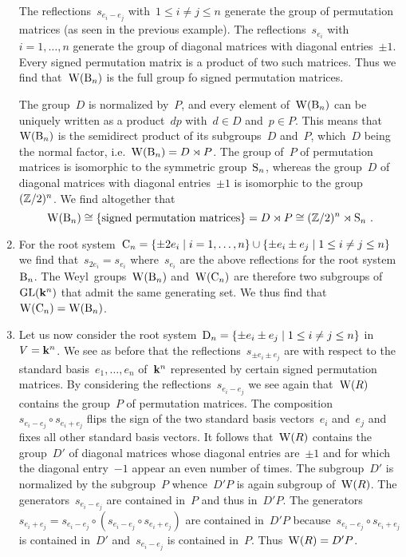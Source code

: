 \begin{examples}
\begin{enumerate}
      The reflections~$s_{e_i - e_j}$ with~$1 \leq i \neq j \leq n$ generate the group of permutation matrices (as seen in the previous example).
      The reflections~$s_{e_i}$ with~$i = 1, \dotsc, n$ generate the group of diagonal matrices with diagonal entries~$\pm 1$.
      Every signed permutation matrix is a product of two such matrices.
      Thus we find that~$\operatorname{W}(\mathrm{B}_n)$ is the full group fo signed permutation matrices.
      
      The group~$D$ is normalized by~$P$, and every element of~$\operatorname{W}(\mathrm{B}_n)$ can be uniquely written as a product~$dp$ with~$d \in D$ and~$p \in P$.
      This means that~$\operatorname{W}(\mathrm{B}_n)$ is the semidirect product of its subgroups~$D$ and~$P$, which~$D$ being the normal factor, i.e.~$\operatorname{W}(\mathrm{B}_n) = D \rtimes P$.
      The group of~$P$ of permutation matrices is isomorphic to the symmetric group~$\operatorname{S}_n$, whereas the group~$D$ of diagonal matrices with diagonal entries~$\pm 1$ is isomorphic to the group~$(\mathbb{Z}/2)^n$.
      We find altogether that
      \[
        \operatorname{W}(\mathrm{B}_n)
        \cong
        \{ \text{signed permutation matrices} \}
        =
        D \rtimes P
        \cong
        (\mathbb{Z}/2)^n \rtimes \operatorname{S}_n \,.
      \]
    \item
      For the root system~$\rootC_n = \{ \pm 2 e_i \suchthat i = 1, \dotsc, n \} \cup \{ \pm e_i \pm e_j \suchthat 1 \leq i \neq j \leq n \}$ we find that~$s_{2e_i} = s_{e_i}$ where~$s_{e_i}$ are the above reflections for the root system~$\mathrm{B}_n$.
      The Weyl~groups~$\operatorname{W}(\mathrm{B}_n)$ and~$\operatorname{W}(\mathrm{C}_n)$ are therefore two subgroups of~$\operatorname{GL}(\mathbf{k}^n)$ that admit the same generating set.
      We thus find that~$\operatorname{W}(\mathrm{C}_n) = \operatorname{W}(\mathrm{B}_n)$.
    \item
      Let us now consider the root system~$\rootD_n = \{ \pm e_i \pm e_j \suchthat 1 \leq i \neq j \leq n \}$ in~$V = \mathbf{k}^n$.
      We see as before that the reflections~$s_{\pm e_i \pm e_j}$ are with respect to the standard basis~$e_1, \dotsc, e_n$ of~$\mathbf{k}^n$ represented by certain signed permutation matrices.
      By considering the reflections~$s_{e_i - e_j}$ we see again that~$\operatorname{W}(R)$ contains the group~$P$ of permutation matrices.
      The composition~$s_{e_i - e_j} \circ s_{e_i + e_j}$ flips the sign of the two standard basis vectors~$e_i$ and~$e_j$ and fixes all other standard basis vectors.
      It follows that~$\operatorname{W}(R)$ contains the group~$D'$ of diagonal matrices whose diagonal entries are~$\pm 1$ and for which the diagonal entry~$-1$ appear an even number of times.
      The subgroup~$D'$ is normalized by the subgroup~$P$ whence~$D'P$ is again subgroup of~$\operatorname{W}(R)$.
      The generators~$s_{e_i - e_j}$ are contained in~$P$ and thus in~$D' P$.
      The generators~$s_{e_i + e_j} = s_{e_i - e_j} \circ (s_{e_i - e_j} \circ s_{e_i + e_j})$ are contained in~$D' P$ because~$s_{e_i - e_j} \circ s_{e_i + e_j}$ is contained in~$D'$ and~$s_{e_i - e_j}$ is contained in~$P$.
      Thus~$\operatorname{W}(R) = D' P$.
      

\end{enumerate}
\end{examples}
